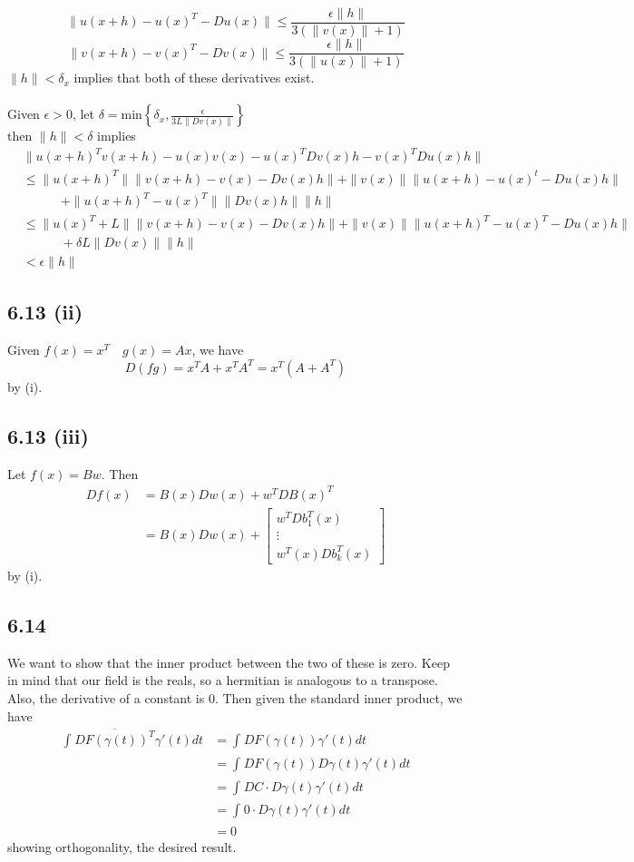 \documentclass[letterpaper,12pt]{article}
\theoremstyle{definition}
\begin{document}
\[    \|u(x+h) - u(x)^T - Du(x)\| \leq \frac{\epsilon \|h\|}{3(\|v(x)\|+1)}\]
\[   \|v(x+h) - v(x)^T - Dv(x)\| \leq \frac{\epsilon \|h\|}{3(\|u(x)\|+1)}\]
$\|h\| <\delta_x$ implies that both of these derivatives exist.\\\\
Given $\epsilon > 0$, let $\delta = \text{min} \left\{ \delta_x, \frac{\epsilon}{3L\|Dv(x)\|}\right\}$\\
then $\|h\| < \delta$ implies
\begin{align*}
    & \| u (x+h)^Tv(x+h) - u(x)v(x) - u(x)^TDv(x)h - v(x)^TDu(x)h\| \\
    & \leq \|u(x+h)^T\|\|v(x+h)-v(x)-Dv(x)h\| + \|v(x)\|\|u(x+h)-u(x)^t - Du(x)h\|\\
    & \quad \quad \quad     +\|u(x+h)^T-u(x)^T\|\|Dv(x)h\|\|h\|\\
    & \leq \|u(x)^T + L\|\|v(x+h) - v(x) - Dv(x)h\| + \|v(x)\|\|u(x+h)^T-u(x)^T - Du(x)h\| \\
    & \quad \quad \quad     + \delta L\|Dv(x)\|\|h\|\\
    & < \epsilon \|h\|
\end{align*}


\subsection*{6.13 (ii)}
Given $f(x)= x^T \quad g(x) = Ax$, we have
\[D(fg) = x^TA + x^TA^T = x^T(A+A^T)\]
by (i).

\subsection*{6.13 (iii)}
Let $f(x) = Bw$. Then
\begin{align*}
    Df(x) &= B(x)Dw(x) + w^TDB(x)^T\\
    &= B(x)Dw(x) + \begin{bmatrix} w^TDb_1^T(x)\\
        \vdots \\
        w^T(x)Db_k^T(x)
    \end{bmatrix}
\end{align*}
by (i).




\subsection*{6.14}
We want to show that the inner product between the two of these is zero. Keep in mind that our field is the reals, so a hermitian is analogous to a transpose. Also, the derivative of a constant is 0. Then given the standard inner product, we have
\begin{align*}
    \int^{}_{}\overline {DF(\gamma(t))^T} \gamma'(t) dt &=  \int^{}_{}DF(\gamma(t)) \gamma'(t) dt \\
    &=  \int^{}_{}DF(\gamma(t))D\gamma(t) \gamma'(t) dt \\
    &=  \int^{}_{}DC\cdot D\gamma(t) \gamma'(t) dt \\
    &=  \int^{}_{}0\cdot D\gamma(t) \gamma'(t) dt \\
    &=  0
\end{align*}
showing orthogonality, the desired result.
\end{document}
